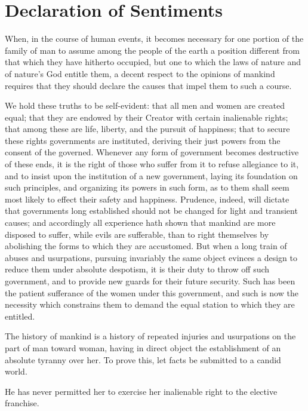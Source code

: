 
\author{Elizabeth Cady Stanton}
\chapter{Declaration of Sentiments}

When, in the course of human events, it becomes necessary for
one portion of the family of man to assume among the people of the
earth a position different from that which they have hitherto
occupied, but one to which the laws of nature and of nature's God
entitle them, a decent respect to the opinions of mankind requires
that they should declare the causes that impel them to such a course.

We hold these truths to be self-evident: that all men and women are
created equal; that they are endowed by their Creator with certain
inalienable rights; that among these are life, liberty, and the
pursuit of happiness; that to secure these rights governments are
instituted, deriving their just powers from the consent of the
governed. Whenever any form of government becomes destructive of these
ends, it is the right of those who suffer from it to refuse allegiance
to it, and to insist upon the institution of a new government, laying
its foundation on such principles, and organizing its powers in such
form, as to them shall seem most likely to effect their safety and
happiness. Prudence, indeed, will dictate that governments long
established should not be changed for light and transient causes; and
accordingly all experience hath shown that mankind are more disposed
to suffer, while evils are sufferable, than to right themselves by
abolishing the forms to which they are accustomed. But when a long
train of abuses and usurpations, pursuing invariably the same object
evinces a design to reduce them under absolute despotism, it is their
duty to throw off such government, and to provide new guards for their
future security. Such has been the patient sufferance of the women
under this government, and such is now the necessity which constrains
them to demand the equal station to which they are entitled.

The history of mankind is a history of repeated injuries and
usurpations on the part of man toward woman, having in direct object
the establishment of an absolute tyranny over her. To prove this, let
facts be submitted to a candid world.

He has never permitted her to exercise her inalienable right to the
elective franchise.

